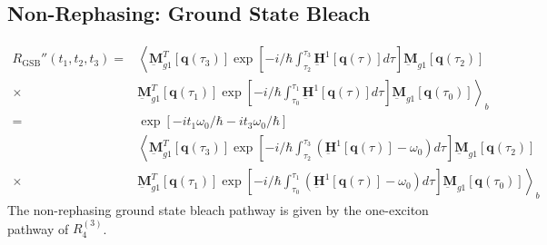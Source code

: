 \documentclass{article}
\newcommand{\bra}[1]{\ensuremath{\left\langle#1\right|}}
\newcommand{\ket}[1]{\ensuremath{\left|#1\right\rangle}}
\newcommand{\vect}[1]{\ensuremath{\boldsymbol{\mathbf{#1}}}}
\newcommand{\arw}{-{Latex[length=2mm]}}
\begin{document}
\clearpage
\subsection{Non-Rephasing: Ground State Bleach}
\begin{figure}[h]
\centering
{}
\end{figure}
\begin{equation}
\begin{split}
 R_\mathrm{GSB}''(t_{1},t_{2},t_{3})=&\left\langle\underbar{\vect{M}}_{g1}^{T}[\vect q(\tau_{3})]\exp\left[-i/\hbar\int_{\tau_{2}}^{\tau_{3}}\underbar{\vect{H}}^{1}[\vect q(\tau)]d\tau\right] \underbar{\vect{M}}_{g1} [\vect q(\tau_{2})]\right.\\
 \times&\left.\underbar{\vect{M}}_{g1}^{T}[\vect q(\tau_{1})]\exp\left[-i/\hbar\int_{\tau_{0}}^{\tau_{1}}\underbar{\vect{H}}^{1}[\vect q(\tau)]d\tau\right] \underbar{\vect{M}}_{g1} [\vect q(\tau_{0})]\right\rangle_{b}\\
 =&\exp\left[-i t_{1}\omega_{0}/\hbar-it_{3}\omega_{0}/\hbar\right]\\
 &\left\langle\underbar{\vect{M}}_{g1}^{T}[\vect q(\tau_{3})]\exp\left[-i/\hbar\int_{\tau_{2}}^{\tau_{3}}\left(\underbar{\vect{H}}^{1}[\vect q(\tau)]-\omega_{0}\right)d\tau\right] \underbar{\vect{M}}_{g1} [\vect q(\tau_{2})]\right.\\
 \times&\left.\underbar{\vect{M}}_{g1}^{T}[\vect q(\tau_{1})]\exp\left[-i/\hbar\int_{\tau_{0}}^{\tau_{1}}\left(\underbar{\vect{H}}^{1}[\vect q(\tau)]-\omega_{0}\right)d\tau\right] \underbar{\vect{M}}_{g1} [\vect q(\tau_{0})]\right\rangle_{b}
\end{split}
\end{equation}
The non-rephasing ground state bleach pathway is given by the one-exciton pathway of $R_{4}^{(3)}$.

\clearpage
\end{document}
